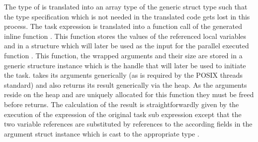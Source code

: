 The type of  is translated into an array type of the generic  struct type such that the type specification  which is not needed in the translated code gets lost in this process. The task expression  is translated into a function call of the generated inline function . This function stores the values of the referenced local variables  and  in a structure which will later be used as the input for the parallel executed function . This function, the wrapped arguments and their size are stored in a generic  structure instance which is the handle that will later be used to initiate the task.  takes its arguments generically (as is required by the POSIX threads standard) and also returns its result generically via the heap. As the arguments reside on the heap and are uniquely allocated for this function they must be freed before  returns. The calculation of the result is straightforwardly given by the execution of the expression of the original task sub expression  except that the two variable references are substituted by references to the according fields in the argument struct instance  which is cast to the appropriate type .
